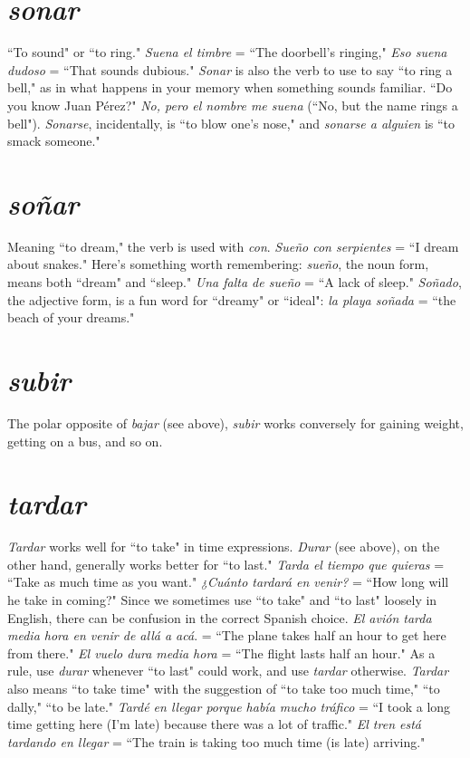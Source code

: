 \section{\emph{sonar}}

``To sound" or ``to ring." \emph{Suena el timbre} = ``The doorbell's
ringing," \emph{Eso suena dudoso} = ``That sounds dubious." \emph{Sonar} is also
the verb to use to say ``to ring a bell," as in what happens in your
memory when something sounds familiar. ``Do you know Juan Pérez?"
\emph{No, pero el nombre me suena} (``No, but the name rings a bell"). \emph{Sonarse}, incidentally, is ``to blow one's nose," and \emph{sonarse a alguien} is
``to smack someone."

\section{\emph{soñar}}

Meaning ``to dream," the verb is used with \emph{con}. \emph{Sueño con serpientes} = ``I dream about snakes." Here's something worth remembering: \emph{sueño}, the noun form, means both ``dream" and ``sleep." \emph{Una
	falta de sueño} = ``A lack of sleep." \emph{Soñado}, the adjective form, is a
fun word for ``dreamy" or ``ideal": \emph{la playa soñada} = ``the beach of
your dreams."

\section{\emph{subir}}

The polar opposite of \emph{bajar} (see above), \emph{subir} works conversely
for gaining weight, getting on a bus, and so on.

\section{\emph{tardar}}

\emph{Tardar} works well for ``to take" in time expressions. \emph{Durar}
(see above), on the other hand, generally works better for ``to last."
\emph{Tarda el tiempo que quieras} = ``Take as much time as you want."
\emph{¿Cuánto tardará en venir?} = ``How long will he take in coming?"
Since we sometimes use ``to take" and ``to last" loosely in English,
there can be confusion in the correct Spanish choice. \emph{El avión tarda
	media hora en venir de allá a acá}. = ``The plane takes half an hour
to get here from there." \emph{El vuelo dura media hora} = ``The flight lasts
half an hour." As a rule, use \emph{durar} whenever ``to last" could work, and
use \emph{tardar} otherwise. \emph{Tardar} also means ``to take time" with the suggestion of ``to take too much time," ``to dally," ``to be late." \emph{Tardé en
	llegar porque había mucho tráfico} = ``I took a long time getting here
(I'm late) because there was a lot of traffic." \emph{El tren está tardando en
	llegar} = ``The train is taking too much time (is late) arriving."


